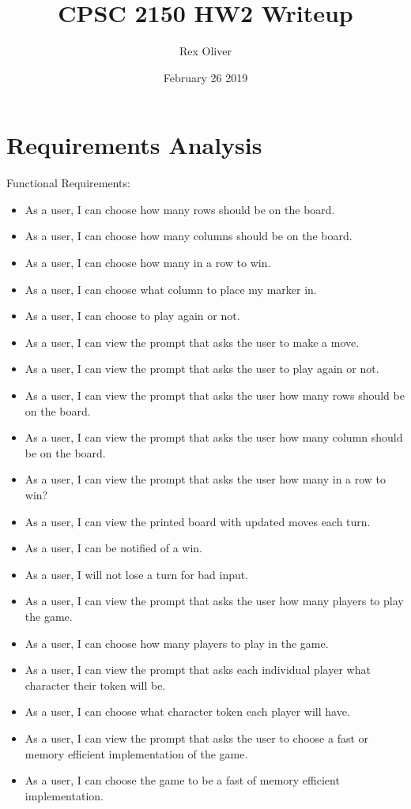 \documentclass{article}
\title{CPSC 2150 HW2 Writeup}
\author{Rex Oliver}
\date{February 26 2019}
\begin{document}
\begin{titlepage}
  \maketitle
\end{titlepage}

\section{Requirements Analysis}
Functional Requirements:
\begin{itemize}
  \item As a user, I can choose how many rows should be on the board.
  \item As a user, I can choose how many columns should be on the board.
  \item As a user, I can choose how many in a row to win.
  \item As a user, I can choose what column to place my marker in.
  \item As a user, I can choose to play again or not.
  \item As a user, I can view the prompt that asks the user to make a move.
  \item As a user, I can view the prompt that asks the user to play again or
    not.
  \item As a user, I can view the prompt that asks the user how many rows should be on the board.
  \item As a user, I can view the prompt that asks the user how many column should be on the board.
  \item As a user, I can view the prompt that asks the user how many in a row to win? 
  \item As a user, I can view the printed board with updated moves each turn.
  \item As a user, I can be notified of a win.
  \item As a user, I will not lose a turn for bad input.
  \item As a user, I can view the prompt that asks the user how many players to play the game.
  \item As a user, I can choose how many players to play in the game.
  \item As a user, I can view the prompt that asks each individual player what character their token will be.
  \item As a user, I can choose what character token each player will have. 
  \item As a user, I can view the prompt that asks the user to choose a fast or memory efficient implementation of the game.
  \item As a user, I can choose the game to be a fast of memory efficient implementation. 
\end{itemize}
\end{document}

